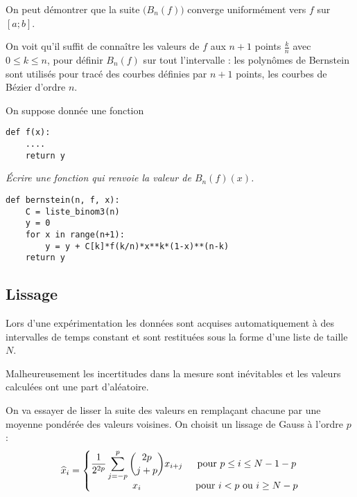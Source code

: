 On peut démontrer que la suite $\bigl(B_n(f)\bigr)$  converge uniformément vers $f$ sur $[a;b]$.

On voit qu'il suffit de connaître les valeurs de $f$ aux $n+1$ points $\frac kn$ avec $0\le k \le n$, pour définir $B_n(f)$ sur tout l'intervalle : les polynômes de Bernstein sont utilisés pour tracé des courbes définies par $n+1$ points, les courbes de Bézier d'ordre $n$.

On suppose donnée une fonction
\begin{lstlisting}
def f(x):
    ....
    return y 
\end{lstlisting}
\begin{Exercise}
\it Écrire une fonction  qui renvoie la valeur de $B_n(f)(x)$.
\end{Exercise}
\begin{Answer}
\begin{lstlisting}
def bernstein(n, f, x):
    C = liste_binom3(n)
    y = 0
    for x in range(n+1):
        y = y + C[k]*f(k/n)*x**k*(1-x)**(n-k)
    return y
\end{lstlisting}
\end{Answer}
\subsection{Lissage}
Lors d'une expérimentation les données sont acquises automatiquement à des intervalles de temps constant et sont restituées sous la forme d'une liste  de taille $N$. 

Malheureusement les incertitudes dans la mesure sont inévitables et les valeurs calculées ont une part d'aléatoire.

On va essayer de lisser la suite des valeurs en remplaçant chacune par une moyenne pondérée des valeurs voisines.  On choisit un lissage de Gauss à l'ordre $p$ :
\[\widehat x_i = \left\{\begin{matrix}
\displaystyle \frac 1{2^{2p}}\sum_{j=-p}^{p}\binom {2p}{j+p} x_{i+j}&\hbox{ pour }p\le i \le N-1-p\\ 
x_i&\hbox{ pour } i<p\hbox{ ou } i\ge N-p\end{matrix}\right.\]

